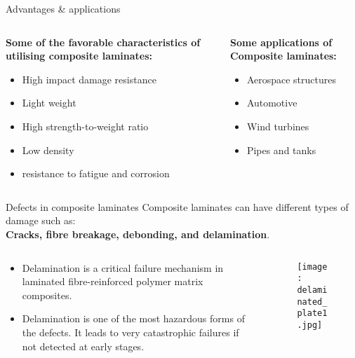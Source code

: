 \documentclass[10pt,aspectratio=169,dvipsnames]{beamer} %
\begin{document}
	\begin{frame}{Advantages \& applications}
		\begin{columns}[T]
			\begin{column}[t]{.45\textwidth}
				\textbf{Some of the favorable characteristics of utilising composite laminates:}
				\begin{itemize}
					\item \alert{High impact damage resistance}
					\item \alert{Light weight}
					\item \alert{High strength-to-weight ratio}
					\item \alert{Low density}
					\item \alert{resistance to fatigue and corrosion}
				\end{itemize}
			\end{column}
			\begin{column}[t]{.45\textwidth}
				\textbf{Some applications of Composite laminates:}
				\begin{itemize}
					\item \alert{Aerospace structures}
					\item \alert{Automotive}
					\item \alert{Wind turbines}
					\item \alert{Pipes and tanks}
				\end{itemize}
			\end{column}
		\end{columns}
	\end{frame}
	\begin{frame}{Defects in composite laminates}
		\small
		Composite laminates can have different types of damage such as: \\
		\textbf{Cracks, fibre breakage, debonding, and \alert{delamination}}.
		\begin{columns}[T]
			\begin{column}[c]{.45\textwidth}
				\begin{itemize}
					\footnotesize
					\item Delamination is a critical failure mechanism in laminated fibre-reinforced polymer matrix composites.
					\item Delamination is one of the most hazardous forms of the defects. 
					It leads to very catastrophic failures if not detected at early stages.
				\end{itemize}
			\end{column}
			\begin{column}[c]{0.50\textwidth}
				\begin{figure}
					\texttt{[image: delaminated\_plate1.jpg]}
				\end{figure}
			\end{column}
		\end{columns}
	\end{frame}
	
\end{document}
